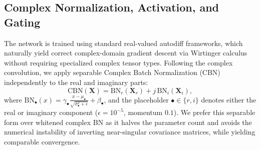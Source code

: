 \documentclass[journal,10pt]{IEEEtran}
\newcommand{\R}{\mathbb{R}}
\newcommand{\bW}{\mathbf{W}}
\newcommand{\bX}{\mathbf{X}}
\newcommand{\bs}{\mathbf{s}}
\newcommand{\BN}{\mathrm{BN}}
\begin{document}

\subsection{Complex Normalization, Activation, and Gating}
The network is trained using standard real-valued autodiff frameworks, which naturally yield correct complex-domain gradient descent via Wirtinger calculus \cite{wirtinger} without requiring specialized complex tensor types. Following the complex convolution, we apply separable Complex Batch Normalization (CBN) \cite{trabelsi2018deep} independently to the real and imaginary parts:
\begin{equation}
\mathrm{CBN}(\bX)=\BN_r(\bX_r)+j\,\BN_i(\bX_i),
\label{eq:cbn}
\end{equation}
where \(\BN_\bullet(x)=\gamma_\bullet\frac{x-\mu_\bullet}{\sqrt{\sigma_\bullet^2+\epsilon}}+\beta_\bullet\), and the placeholder \(\bullet \in \{r, i\}\) denotes either the real or imaginary component (\(\epsilon=10^{-5}\), momentum \(0.1\)). We prefer this separable form over whitened complex BN as it halves the parameter count and avoids the numerical instability of inverting near-singular covariance matrices, while yielding comparable convergence.
\end{document}

